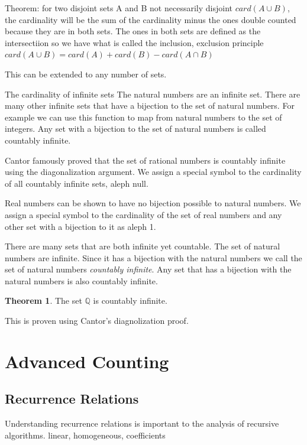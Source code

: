 \documentclass[11pt]{book} %
\theoremstyle {definition}
\newtheorem {theorem}{Theorem}[section]
\theoremstyle {remark}
\begin{document}
Theorem: for two disjoint sets A and B not necessarily disjoint
$card(A \cup B)$, the cardinality will be the sum of the cardinality minus the ones double counted because they are in both sets. The ones in both sets are defined as the intersectiion so we have what is called the inclusion, exclusion principle
$card(A \cup B) = card(A) + card(B) - card(A \cap B)$

This can be extended to any number of sets.

The cardinality of infinite sets
The natural numbers are an infinite set. There are many other infinite sets that have a bijection to the set of natural numbers. For example we can use this function to map from natural numbers to the set of integers.  Any set with a bijection to the set of natural numbers is called countably infinite.

Cantor famously proved that the set of rational numbers is countably infinite using the diagonalization argument. We assign a special symbol to the cardinality of all countably infinite sets, aleph null.

Real numbers can be shown to have no bijection possible to natural numbers. We assign a special symbol to the cardinality of the set of real numbers and any other set with a bijection to it as aleph 1.  

There are many sets that are both infinite yet countable. The set of natural numbers are infinite. Since it has a bijection with the natural numbers we call the set of natural numbers \textit{countably infinite}. Any set that has a bijection with the natural numbers is also countably infinite. 

\begin {theorem}
The set $\mathbb{Q}$ is countably infinite. 
\end {theorem}
This is proven using Cantor's diagnolization proof.


    
\newpage



                                                                                   


\chapter {Advanced Counting}
\section {Recurrence Relations}
Understanding recurrence relations is important to the analysis of recursive algorithms. 
linear, homogeneous, coefficients
\end{document}
